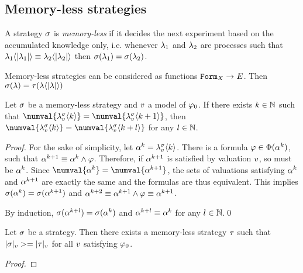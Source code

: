 \subsection{Memory-less strategies}

\begin{definition}
A strategy $\sigma$ is \emph{memory-less} if it decides the next experiment
  based on the accumulated knowledge only, i.e.
  whenever $\lambda_1$ and $\lambda_2$ are processes such that
  $\lambda_1\langle|\lambda_1|\rangle \equiv \lambda_2\langle|\lambda_2|\rangle$
  then
  $\sigma(\lambda_1) = \sigma(\lambda_2)$.

Memory-less strategies can be considered as functions $\mathtt{Form}_X -> E$.
Then $\sigma(\lambda) = \tau(\lambda\langle|\lambda|\rangle)$
\end{definition}

\begin{lemma}
Let $\sigma$ be a memory-less strategy and $v$ a model of $\varphi_0$.
If there exists $k\in\mathbb{N}$ such that
  $\numval{\stgknow{\stg}{\val}{k}} = \numval{\stgknow{\stg}{\val}{k+1}}$,
 then
  $\numval{\stgknow{\stg}{\val}{k}} = \numval{\stgknow{\stg}{\val}{k+l}}$
 for any $l\in\mathbb{N}$.
\end{lemma}

\begin{proof}
For the sake of simplicity, let $\alpha^k = \lambda^{\sigma}_{v}\langle k\rangle$.
There is a formula $\varphi\in\Phi(\alpha^k)$,
  such that $\alpha^{k+1} \equiv \alpha^{k} \wedge \varphi$.
Therefore, if $\alpha^{k+1}$ is satisfied by valuation $v$, so must be $\alpha^{k}$.
Since $\numval{\know^{k}} = \numval{\know^{k+1}}$, the sets of
  valuations satisfying $\alpha^{k}$ and $\alpha^{k+1}$ are exactly the same
  and the formulas are thus equivalent.
This implies $\sigma(\alpha^{k}) = \sigma(\alpha^{k+1})$ and $\alpha^{k+2} \equiv \alpha^{k+1}\wedge \varphi \equiv \alpha^{k+1}$.

By induction,
  $\sigma(\alpha^{k+l}) = \sigma(\alpha^{k})$ and
  $\alpha^{k+l} \equiv \alpha^{k}$
  for any $l\in\mathbb{N}$.\qed
\end{proof}

\begin{lemma}
Let $\sigma$ be a strategy.
Then there exists a memory-less strategy $\tau$ such that
  $|\sigma|_{v} >= |\tau|_{v}$ for all $v$ satisfying $\varphi_0$.
\end{lemma}

\begin{proof}
\end{proof}

